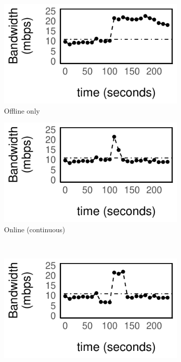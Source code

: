 \begin{figure}
  \centering
  \begin{subfigure}[t]{0.48\columnwidth}
    \centering
    \includegraphics[width=\textwidth]{figures/online1.pdf}
    \caption{Offline only}
    \label{fig:offline}
  \end{subfigure}
  \hfill
  \begin{subfigure}[t]{0.48\columnwidth}
    \centering
    \includegraphics[width=\textwidth]{figures/online2.pdf}
    \caption{Online (continuous)}
    \label{fig:online}
  \end{subfigure}
  \\
  \vspace{1.5em}
  \begin{subfigure}[t]{0.49\columnwidth}
    \includegraphics[width=\textwidth]{figures/online3.pdf}

\end{subfigure}
\end{figure}
